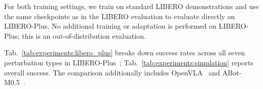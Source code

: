 For both training settings, we train \method{} on standard LIBERO demonstrations
and use the same checkpoints as in the LIBERO evaluation to evaluate directly
on LIBERO-Plus. No additional training or adaptation is performed on
LIBERO-Plus; this is an out-of-distribution evaluation.

Tab.~\ref{tab:experiments:libero_plus} breaks down success rates across
all seven perturbation types in LIBERO-Plus~\citep{fei2025liberoplus};
Tab.~\ref{tab:experiments:simulation} reports overall success.
The comparison additionally includes OpenVLA~\citep{kim2024openvla}
and ABot-M0.5~\citep{chen2026abotm05}.

% 

